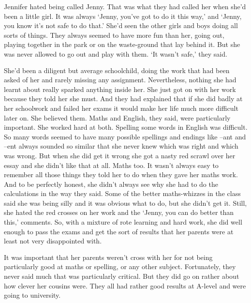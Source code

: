 

\prelude

Jennifer hated being called Jenny. That was what they had called 
her when she'd been a little girl. It was always `Jenny, you've 
got to do it this way,' and `Jenny, you know it's not safe to do 
that.' She'd seen the other girls and boys doing all sorts of 
things. They always seemed to have more fun than her, going out, 
playing together in the park or on the waste-ground that lay behind 
it. But she was never allowed to go out and play with them. `It 
wasn't safe,' they said.

She'd been a diligent but average schoolchild, doing the work that 
had been asked of her and rarely missing any assignment. Nevertheless, 
nothing she had learnt about really sparked anything inside her. 
She just got on with her work because they told her she must. And 
they had explained that if she did badly at her schoolwork and 
failed her exams it would make her life much more difficult later 
on. She believed them. Maths and English, they said, were 
particularly important. She worked hard at both. Spelling some 
words in English was difficult. So many words seemed to have many 
possible spellings and endings like --ant and --ent always sounded 
so similar that she never knew which was right and which was wrong. 
But when she did get it wrong she got a nasty red scrawl over her 
essay and she didn't like that at all. Maths too. It wasn't 
always easy to remember all those things they told her to do when 
they gave her maths work. And to be perfectly honest, she didn't 
always see why she had to do the calculations in the way they said. 
Some of the better maths-whizzes in the class said she was being 
silly and it was obvious what to do, but she didn't get it. Still, 
she hated the red crosses on her work and the `Jenny, you can do 
better than this,' comments. So, with a mixture of rote learning 
and hard work, she did well enough to pass the exams and get the 
sort of results that her parents were at least not very disappointed with.

It was important that her parents weren't cross with her for not 
being particularly good at maths or spelling, or any other subject. 
Fortunately, they never said much that was particularly critical. 
But they did go on rather about how clever her cousins were. They 
all had rather good results at A-level and were going to 
university.

